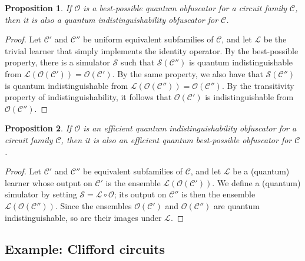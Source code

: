 \documentclass[11pt]{article}
\numberwithin{equation}{section}
\newtheorem{proposition}{Proposition}
\begin{document}
{\begin{proposition} If $\mathcal O$ is a best-possible quantum obfuscator for a circuit family $\mathcal C$, then it is also a quantum indistinguishability obfuscator for $\mathcal C$.
\end{proposition}
\begin{proof}
Let $\mathcal C'$ and $\mathcal C''$ be uniform equivalent subfamilies of $\mathcal C$, and let $\mathcal L$ be the trivial learner that simply implements the identity operator. By the best-possible property, there is a simulator $\mathcal S$ such that $\mathcal S(\mathcal C'')$ is quantum indistinguishable from $\mathcal L ( \mathcal O( \mathcal C')) = \mathcal O ( \mathcal C')$. By the same property, we also have that $\mathcal S(\mathcal C'')$ is quantum indistinguishable from $\mathcal L(\mathcal O (\mathcal C'')) = \mathcal O( \mathcal C'')$. By the transitivity property of indistinguishability, it follows that $\mathcal O(\mathcal C')$ is indistinguishable from $\mathcal O(\mathcal C'')$.
\end{proof}

\begin{proposition} If $\mathcal O$ is an efficient quantum indistinguishability obfuscator for a circuit family $\mathcal C$, then it is also an efficient quantum best-possible obfuscator for $\mathcal C$.
\end{proposition}
\begin{proof}
Let $\mathcal C'$ and $\mathcal C''$ be equivalent subfamilies of $\mathcal C$, and let $\mathcal L$ be a (quantum) learner whose output on $\mathcal C'$ is the ensemble $\mathcal L(\mathcal O (\mathcal C'))$. We define a (quantum) simulator by setting $\mathcal S = \mathcal L \circ \mathcal O$; its output on $\mathcal C''$ is then the ensemble $\mathcal L(\mathcal O(\mathcal C''))$. Since the ensembles $\mathcal O(\mathcal C')$ and $\mathcal O(\mathcal C'')$ are quantum indistinguishable, so are their images under $\mathcal L$.
\end{proof}

\subsection{Example: Clifford circuits}

}
\end{document}
